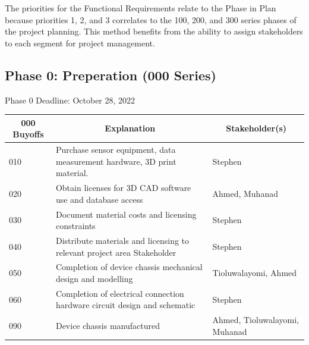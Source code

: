 \documentclass[12pt]{article}
\begin{document}
The priorities for the Functional Requirements relate to the Phase in Plan because priorities 1, 2, and 3 correlates to the 100, 200, and 300 series phases of the project planning. This method benefits from the ability to assign stakeholders to each segment for project management.

\newpage

\noindent
\subsection{Phase 0: Preperation (000 Series)}
Phase 0 Deadline: October 28, 2022\\

\begin{table}[H]
  \centering
  \begin{tabular}{|p{2cm}|p{10cm}|p{2cm}|}
  \hline
  \multicolumn{1}{|c|}{\textbf{000 Buyoffs}} & \multicolumn{1}{c|}{\textbf{Explanation}} & \multicolumn{1}{|c|}{\textbf{Stakeholder(s)}}
  \\ \hline
  010
  & Purchase sensor equipment, data measurement hardware, 3D print material.
  & Stephen
  \newline                                
  \\ \hline

  020                              
  & Obtain licenses for 3D CAD software use and database access
  & Ahmed, Muhanad
  \newline                                
  \\ \hline

  030                          
  & Document material costs and licensing constraints
  & Stephen
  \newline                                
  \\ \hline

  040                                
  & Distribute materials and licensing to relevant project area Stakeholder
  & Stephen 
  \newline                            
  \\ \hline

  050                                
  & Completion of device chassis mechanical design and modelling
  & Tioluwalayomi, Ahmed
  \newline                            
  \\ \hline

  060                                
  & Completion of electrical connection hardware circuit design and schematic
  & Stephen 
  \newline                            
  \\ \hline

  090                                
  & Device chassis manufactured
  & Ahmed, Tioluwalayomi, Muhanad
  \newline                            
  \\ \hline

  \end{tabular}
\end{table}
\newpage
\end{document}
